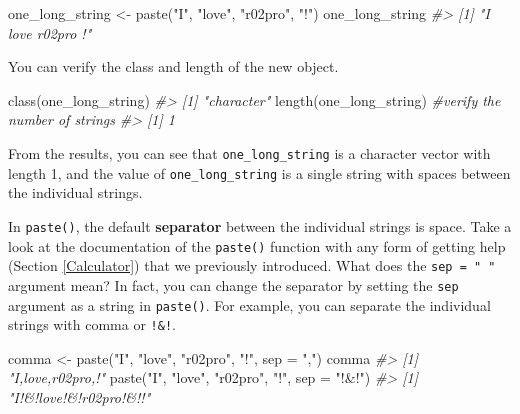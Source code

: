 \documentclass[
]{book}
\newenvironment{Shaded}{\begin{snugshade}}{\end{snugshade}}
\newcommand{\AttributeTok}[1]{\textcolor[rgb]{0.77,0.63,0.00}{#1}}
\newcommand{\CommentTok}[1]{\textcolor[rgb]{0.56,0.35,0.01}{\textit{#1}}}
\newcommand{\FunctionTok}[1]{\textcolor[rgb]{0.00,0.00,0.00}{#1}}
\newcommand{\NormalTok}[1]{#1}
\newcommand{\OtherTok}[1]{\textcolor[rgb]{0.56,0.35,0.01}{#1}}
\newcommand{\StringTok}[1]{\textcolor[rgb]{0.31,0.60,0.02}{#1}}
\begin{document}
\begin{Shaded}
\begin{Highlighting}[]
\NormalTok{one\_long\_string }\OtherTok{\textless{}{-}} \FunctionTok{paste}\NormalTok{(}\StringTok{"I"}\NormalTok{, }\StringTok{"love"}\NormalTok{, }\StringTok{"r02pro"}\NormalTok{, }\StringTok{"!"}\NormalTok{)}
\NormalTok{one\_long\_string}
\CommentTok{\#\textgreater{} [1] "I love r02pro !"}
\end{Highlighting}
\end{Shaded}

You can verify the class and length of the new object.

\begin{Shaded}
\begin{Highlighting}[]
\FunctionTok{class}\NormalTok{(one\_long\_string)}
\CommentTok{\#\textgreater{} [1] "character"}
\FunctionTok{length}\NormalTok{(one\_long\_string) }\CommentTok{\#verify the number of strings}
\CommentTok{\#\textgreater{} [1] 1}
\end{Highlighting}
\end{Shaded}

From the results, you can see that \texttt{one\_long\_string} is a character vector with length 1, and the value of \texttt{one\_long\_string} is a single string with spaces between the individual strings.

In \texttt{paste()}, the default \textbf{separator} between the individual strings is space. Take a look at the documentation of the \texttt{paste()} function with any form of getting help (Section \ref{Calculator}) that we previously introduced. What does the \texttt{sep\ =\ "\ "} argument mean? In fact, you can change the separator by setting the \texttt{sep} argument as a string in \texttt{paste()}. For example, you can separate the individual strings with comma or \texttt{!\&!}.

\begin{Shaded}
\begin{Highlighting}[]
\NormalTok{comma }\OtherTok{\textless{}{-}} \FunctionTok{paste}\NormalTok{(}\StringTok{"I"}\NormalTok{, }\StringTok{"love"}\NormalTok{, }\StringTok{"r02pro"}\NormalTok{, }\StringTok{"!"}\NormalTok{, }\AttributeTok{sep =} \StringTok{","}\NormalTok{) }
\NormalTok{comma}
\CommentTok{\#\textgreater{} [1] "I,love,r02pro,!"}
\FunctionTok{paste}\NormalTok{(}\StringTok{"I"}\NormalTok{, }\StringTok{"love"}\NormalTok{, }\StringTok{"r02pro"}\NormalTok{, }\StringTok{"!"}\NormalTok{, }\AttributeTok{sep =} \StringTok{"!\&!"}\NormalTok{) }
\CommentTok{\#\textgreater{} [1] "I!\&!love!\&!r02pro!\&!!"}
\end{Highlighting}
\end{Shaded}
\end{document}
